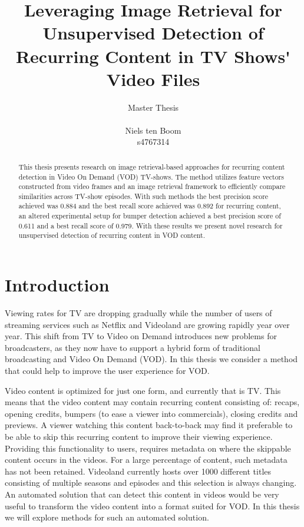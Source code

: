 \documentclass{article}
\begin{document}
\title{Leveraging Image Retrieval for Unsupervised Detection of Recurring Content in TV Shows\'{} Video Files}
\author{Master Thesis\\ \\ Niels ten Boom  \\ s4767314}

\date{\vspace{-3ex}}

\maketitle
\newpage

\begin{abstract}
This thesis presents research on image retrieval-based approaches for recurring content detection in Video On Demand (VOD) TV-shows. The method utilizes feature vectors constructed from video frames and an image retrieval framework to efficiently compare similarities across TV-show episodes. With such methods the best precision score achieved was 0.884 and the best recall score achieved was 0.892 for recurring content, an altered experimental setup for bumper detection achieved a best precision score of 0.611 and a best recall score of 0.979. With these results we present novel research for unsupervised detection of recurring content in VOD content.
\end{abstract}
\newpage

\tableofcontents
\newpage

\section{Introduction} \label{introduction}
Viewing rates for TV are dropping gradually while the number of users of streaming services such as Netflix and Videoland are growing rapidly year over year. This shift from TV to Video on Demand introduces new problems for broadcasters, as they now have to support a hybrid form of traditional broadcasting and Video On Demand (VOD). In this thesis we consider a method that could help to improve the user experience for VOD.

Video content is optimized for just one form, and currently that is TV. This means that the video content may contain recurring content consisting of: recaps, opening credits, bumpers (to ease a viewer into commercials), closing credits and previews. A viewer watching this content back-to-back may find it preferable to be able to skip this recurring content to improve their viewing experience. Providing this functionality to users, requires metadata on where the skippable content occurs in the videos. For a large percentage of content, such metadata has not been retained. Videoland currently hosts over 1000 different titles consisting of multiple seasons and episodes and this selection is always changing. An automated solution that can detect this content in videos would be very useful to transform the video content into a format suited for VOD. In this thesis we will explore methods for such an automated solution.
\end{document}

